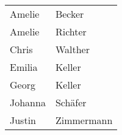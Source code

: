 \begin{enumerate}
        \begin{center}
          \begin{small}
            \tablehead{}
            \tabletail {
            }
            \begin{msoraclesql}
              \begin{supertabular}{ll}
                Amelie & Becker \\
                Amelie & Richter \\
                Chris & Walther \\
                Emilia & Keller \\
                Georg & Keller \\
                Johanna & Schäfer \\
                Justin & Zimmermann \\
              \end{supertabular}
            \end{msoraclesql}
          \end{small}
        \end{center}
      \end{enumerate}
